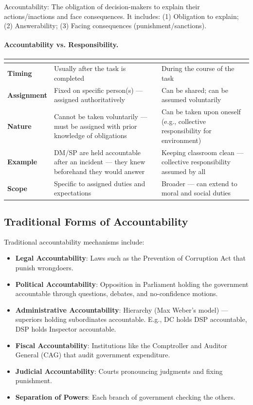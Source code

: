 \begin{KeyConcept}
Accountability: The obligation of decision-makers to explain their actions/inactions and face consequences. It includes: (1) Obligation to explain; (2) Answerability; (3) Facing consequences (punishment/sanctions).
\end{KeyConcept}

\paragraph{Accountability vs. Responsibility.}

\begin{tabularx}{\textwidth}{@{}>{\bfseries\color{Accent}}p{2.2cm} Y Y@{}}
\toprule
{} &  &  \\
\midrule
Timing & Usually after the task is completed & During the course of the task \\
Assignment & Fixed on specific person(s) --- assigned authoritatively & Can be shared; can be assumed voluntarily \\
Nature & Cannot be taken voluntarily --- must be assigned with prior knowledge of obligations & Can be taken upon oneself (e.g., collective responsibility for environment) \\
Example & DM/SP are held accountable after an incident --- they knew beforehand they would answer & Keeping classroom clean --- collective responsibility assumed by all \\
Scope & Specific to assigned duties and expectations & Broader --- can extend to moral and social duties \\
\bottomrule
\end{tabularx}

\subsection{Traditional Forms of Accountability}
Traditional accountability mechanisms include:
\begin{itemize}
\item \textbf{Legal Accountability}: Laws such as the Prevention of Corruption Act that punish wrongdoers.
\item \textbf{Political Accountability}: Opposition in Parliament holding the government accountable through questions, debates, and no-confidence motions.
\item \textbf{Administrative Accountability}: Hierarchy (Max Weber's model) --- superiors holding subordinates accountable. E.g., DC holds DSP accountable, DSP holds Inspector accountable.
\item \textbf{Fiscal Accountability}: Institutions like the Comptroller and Auditor General (CAG) that audit government expenditure.
\item \textbf{Judicial Accountability}: Courts pronouncing judgments and fixing punishment.
\item \textbf{Separation of Powers}: Each branch of government checking the others.
\end{itemize}

